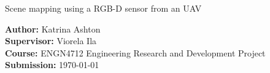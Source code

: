 \begin{titlepage}
\vspace*{\fill}
\begin{center}
{\Huge Scene mapping using a RGB-D sensor from an UAV}
\end{center}
\bigskip
\noindent
\textbf{Author:} Katrina Ashton \\
\textbf{Supervisor:} Viorela Ila \\
\textbf{Course:} ENGN4712 Engineering Research and Development Project \\
\textbf{Submission:} \today \\
\vspace*{\fill}
\end{titlepage}